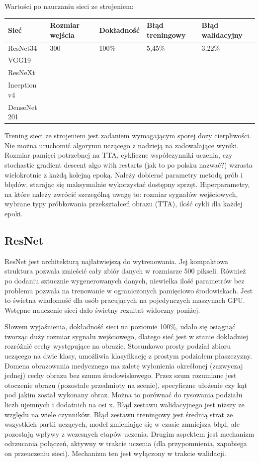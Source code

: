 \documentclass[12pt,a4paper,twoside,titlepage,openright]{book}
\begin{document}
\begin{itemize}
Wartości po nauczaniu sieci ze strojeniem:
\begin{center}
    \begin{tabular}{ | l | l | l | l | l |}
    \hline
    Sieć & Rozmiar wejścia & Dokładność & Błąd treningowy & Błąd walidacyjny \\ \hline
    ResNet34 & 300 & 100\% & 5,45\% & 3,22\% \\ \hline
    VGG19 &  &  &  & \\ \hline
    ResNeXt &  &  &  &  \\ \hline
    Inception v4 &  &  &  &  \\ \hline
    DenseNet 201 &  &  &  &  \\ \hline
    \end{tabular}
\end{center}

Trening sieci ze strojeniem jest zadaniem wymagającym sporej dozy cierpliwości. Nie można uruchomić algorymu uczącego z nadzieją na zadowalające wyniki. Rozmiar pamięci potrzebnej na TTA, cykliczne współczynniki uczenia, czy stochastic gradient descent algo with restarts (jak to po polsku nazwać?) wzrasta wielokrotnie z każdą kolejną epoką. Należy dobierać parametry metodą prób i błędów, starając się maksymalnie wykorzystać dostępny sprzęt. Hiperparametry, na które należy zwrócić szczególną uwagę to: rozmiar sygnałów wejściowych, wybrane typy próbkowania przekształceń obrazu (TTA), ilość cykli dla każdej epoki.

\subsection{ResNet} %
ResNet jest architekturą najłatwiejszą do wytrenowania. Jej kompaktowa struktura pozwala zmieścić cały zbiór danych w rozmiarze 500 pikseli. Również po dodaniu sztucznie wygenerowanych danych, niewielka ilość parametrów bez problemu pozwala na trenowanie w ograniczonych pamięciowo środowiskach. Jest to świetna wiadomość dla osób pracujących na pojedynczych maszynach GPU. Wstępne nauczenie sieci dało świetny rezultat widoczny poniżej.

Słowem wyjaśnienia, dokładność sieci na poziomie 100\%, udało się osiągnąć tworząc duży rozmiar sygnału wejściowego, dlatego sieć jest w stanie dokładniej rozróżnić cechy występujące na obrazie. Stosunkowo prosty podział zbioru uczącego na dwie klasy, umożliwia klasyfikację z prostym podziałem płaszczyzny. Domena obrazowania medycznego ma zaletę wyłonienia okreśłonej (zazwyczaj jednej) cechy obrazu bez szumu środowiskowego. Przez szum rozumiane jest otoczenie obrazu (pozostałe przedmioty na scenie), specyficzne ułożenie czy kąt pod jakim został wykonany obraz. Można to porównać do rysowania podziału liczb ujemnych i dodatnich na osi x.
Błąd zestawu walidacyjnego jest niższy ze względu na wiele czynników. Błąd zestawu treningowy jest średnią strat ze wszystkich partii uczących, model zmieniając się w czasie zmniejsza błąd, ale pozostają wpływy z wczesnych etapów uczenia. Drugim aspektem jest mechanizm odrzucania połączeń, aktywny w trakcie uczenia (dla przypomnienia, zapobiega on przeuczeniu sieci). Mechanizm ten jest wyłączony w trakcie walidacji.


\end{itemize}
\end{document}

